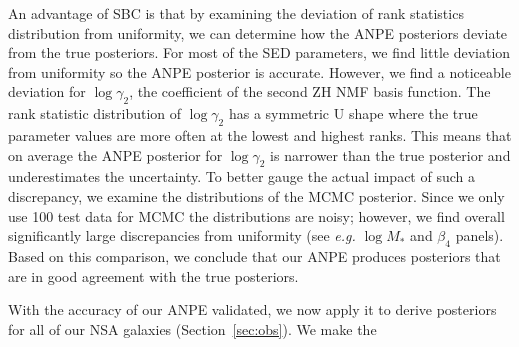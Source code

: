 An advantage of SBC is that by examining the deviation of rank statistics
distribution from uniformity, we can determine how the ANPE posteriors deviate
from the true posteriors. 
For most of the SED parameters, we find little deviation from uniformity so the
ANPE posterior is accurate. 
However, we find a noticeable deviation for $\log\gamma_2$, the coefficient of
the second ZH NMF basis function. 
The rank statistic distribution of $\log\gamma_2$ has a symmetric U shape where
the true parameter values are more often at the lowest and highest ranks.
This means that on average the ANPE posterior for $\log\gamma_2$ is narrower
than the true posterior and underestimates the uncertainty. 
To better gauge the actual impact of such a discrepancy, we examine the
distributions of the MCMC posterior.
Since we only use 100 test data for MCMC the distributions are noisy; however,
we find overall significantly large discrepancies from uniformity (see 
\emph{e.g.} $\log M_*$ and $\beta_4$ panels). 
Based on this comparison, we conclude that our ANPE produces posteriors that
are in good agreement with the true posteriors.  

With the accuracy of our ANPE validated, we now apply it to derive posteriors
for all of our NSA galaxies (Section~\ref{sec:obs}). 
We make the 
